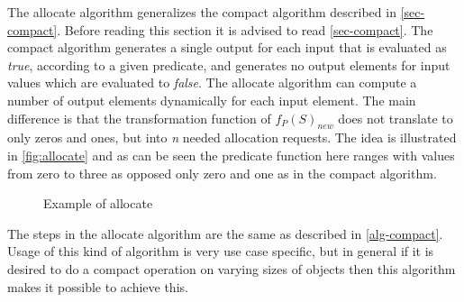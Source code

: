 The allocate algorithm generalizes the compact algorithm described in \autoref{sec-compact}.
Before reading this section it is advised to read \autoref{sec-compact}.
The compact algorithm generates a single output for each input that is evaluated as \textit{true}, according to a given predicate, and generates no output elements for input values which are evaluated to \textit{false}.
The allocate algorithm can compute a number of output elements dynamically for each input element.
The main difference is that the transformation function of $f_{P}(S)_{new}$ does not translate to only zeros and ones, but into \textit{n} needed allocation requests.
The idea is illustrated in \autoref{fig:allocate} and as can be seen the predicate function here ranges with values from zero to three as opposed only zero and one as in the compact algorithm.
\begin{figure}[ht]
	\centering
	\caption{Example of allocate}
	\label{fig:allocate}
\end{figure}
The steps in the allocate algorithm are the same as described in \autoref{alg-compact}.
Usage of this kind of algorithm is very use case specific, but in general if it is desired to do a compact operation on varying sizes of objects then this algorithm makes it possible to achieve this.

